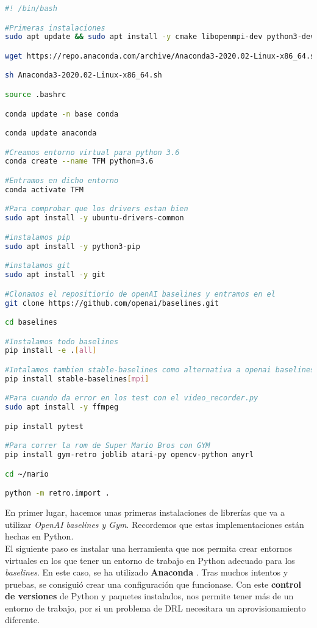 \documentclass[11pt,fleqn]{book} %
\begin{document}
\begin{lstlisting}[language=bash]
#! /bin/bash

#Primeras instalaciones
sudo apt update && sudo apt install -y cmake libopenmpi-dev python3-dev zlib1g-dev

wget https://repo.anaconda.com/archive/Anaconda3-2020.02-Linux-x86_64.sh

sh Anaconda3-2020.02-Linux-x86_64.sh

source .bashrc

conda update -n base conda

conda update anaconda

#Creamos entorno virtual para python 3.6
conda create --name TFM python=3.6

#Entramos en dicho entorno
conda activate TFM

#Para comprobar que los drivers estan bien
sudo apt install -y ubuntu-drivers-common

#instalamos pip
sudo apt install -y python3-pip

#instalamos git
sudo apt install -y git

#Clonamos el repositiorio de openAI baselines y entramos en el
git clone https://github.com/openai/baselines.git

cd baselines

#Instalamos todo baselines
pip install -e .[all]

#Intalamos tambien stable-baselines como alternativa a openai baselines
pip install stable-baselines[mpi]

#Para cuando da error en los test con el video_recorder.py
sudo apt install -y ffmpeg

pip install pytest

#Para correr la rom de Super Mario Bros con GYM
pip install gym-retro joblib atari-py opencv-python anyrl

cd ~/mario

python -m retro.import .

\end{lstlisting} 

En primer lugar, hacemos unas primeras instalaciones de librerías que va a utilizar \textit{OpenAI baselines y Gym}. Recordemos que estas implementaciones están hechas en Python. \\

El siguiente paso es instalar una herramienta que nos permita crear entornos virtuales en los que tener un entorno de trabajo en Python adecuado para los \textit{baselines}. En este caso, se ha utilizado \textbf{Anaconda} \cite{article:anaconda}. Tras muchos intentos y pruebas, se consiguió crear una configuración que funcionase. Con este \textbf{control de versiones} de Python y paquetes instalados, nos permite tener más de un entorno de trabajo, por si un problema de DRL necesitara un aprovisionamiento diferente. \\
\end{document}

